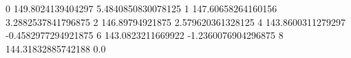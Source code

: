 0 149.8024139404297 5.4840850830078125
1 147.60658264160156 3.2882537841796875
2 146.89794921875 2.579620361328125
4 143.8600311279297 -0.4582977294921875
6 143.0823211669922 -1.2360076904296875
8 144.31832885742188 0.0
